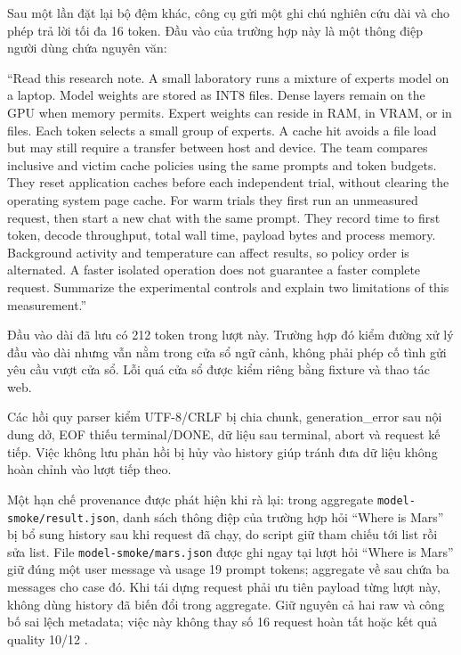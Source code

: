 Sau một lần đặt lại bộ đệm khác, công cụ gửi một ghi chú nghiên cứu dài và cho phép trả lời tối đa 16 token. Đầu vào của trường hợp này là một thông điệp người dùng chứa nguyên văn:

“Read this research note. A small laboratory runs a mixture of experts model on a laptop. Model weights are stored as INT8 files. Dense layers remain on the GPU when memory permits. Expert weights can reside in RAM, in VRAM, or in files. Each token selects a small group of experts. A cache hit avoids a file load but may still require a transfer between host and device. The team compares inclusive and victim cache policies using the same prompts and token budgets. They reset application caches before each independent trial, without clearing the operating system page cache. For warm trials they first run an unmeasured request, then start a new chat with the same prompt. They record time to first token, decode throughput, total wall time, payload bytes and process memory. Background activity and temperature can affect results, so policy order is alternated. A faster isolated operation does not guarantee a faster complete request. Summarize the experimental controls and explain two limitations of this measurement.”

Đầu vào dài đã lưu có 212 token trong lượt này. Trường hợp đó kiểm đường xử lý đầu vào dài nhưng vẫn nằm trong cửa sổ ngữ cảnh, không phải phép cố tình gửi yêu cầu vượt cửa sổ. Lỗi quá cửa sổ được kiểm riêng bằng fixture và thao tác web.

Các hồi quy parser kiểm UTF-8/CRLF bị chia chunk, generation\_error sau nội dung dở, EOF thiếu terminal/DONE, dữ liệu sau terminal, abort và request kế tiếp. Việc không lưu phản hồi bị hủy vào history giúp tránh đưa dữ liệu không hoàn chỉnh vào lượt tiếp theo.

Một hạn chế provenance được phát hiện khi rà lại: trong aggregate \nolinkurl{model-smoke/result.json}, danh sách thông điệp của trường hợp hỏi “Where is Mars” bị bổ sung history sau khi request đã chạy, do script giữ tham chiếu tới list rồi sửa list. File \nolinkurl{model-smoke/mars.json} được ghi ngay tại lượt hỏi “Where is Mars” giữ đúng một user message và usage 19 prompt tokens; aggregate về sau chứa ba messages cho case đó. Khi tái dựng request phải ưu tiên payload từng lượt này, không dùng history đã biến đổi trong aggregate. Giữ nguyên cả hai raw và công bố sai lệch metadata; việc này không thay số 16 request hoàn tất hoặc kết quả quality 10/12 \cite{exp_smoke_validation}.

